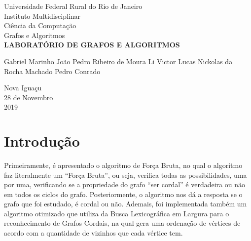 \documentclass[a4paper, 11pt]{article}
\begin{document}
	
	\begin{titlepage}
		
		\begin{center}
			{\large Universidade Federal Rural do Rio de Janeiro}\\[0.2cm]
			{\large Instituto Multidisciplinar}\\[0.2cm]
			{\large Ciência da Computação}\\[0.2cm]
			{\large Grafos e Algoritmos}\\[4cm]
			{\bf \huge LABORATÓRIO DE GRAFOS E ALGORITMOS}\\[4cm]
		\end{center} 
		
		\begin{center}
			{\large Gabriel Marinho}
			\linebreak
			{\large João Pedro Ribeiro de Moura}
			\linebreak
			{\large Li Victor Lucas}	
			\linebreak
			{\large Nickolas da Rocha Machado}
			\linebreak
			{\large Pedro Conrado}
			\\[4cm]
			
		\end{center}
		
		\begin{center}
			{\large Nova Iguaçu}\\[0.2cm]
			{\large 28 de Novembro} \\[0.2cm]
			{\large 2019}
		\end{center}
		
	\end{titlepage}
	\tableofcontents
	\thispagestyle{empty} 
	\newpage
	
	\begin{abstract}
		Este artigo tem como objetivo mostrar e discutir sobre os métodos por nós implementados de Reconhecimento de Grafos Cordais e suas aplicações. Ademais, é apresentado definições e detalhes sobre os métodos utilizados, tais como as funções que foram utilizadas e também, informações sobre a implementação, na qual foi utilizada a linguagem Python na sua versão 3.7.
	\end{abstract}
	
	\section{Introdução}
		\paragraph{} Primeiramente, é apresentado o algoritmo de Força Bruta, no qual o algoritmo faz literalmente um “Força Bruta”, ou seja, verifica todas as possibilidades, uma por uma, verificando se a propriedade do grafo “ser cordal” é verdadeira ou não em todos os ciclos do grafo. Posteriormente, o algoritmo nos dá a resposta se o grafo que foi estudado, é cordal ou não. Ademais, foi implementada também um algoritmo otimizado que utiliza da  Busca Lexicográfica em Largura para o reconhecimento de Grafos Cordais, na qual gera uma ordenação de vértices de acordo com a quantidade de vizinhos que cada vértice tem.
\end{document}
